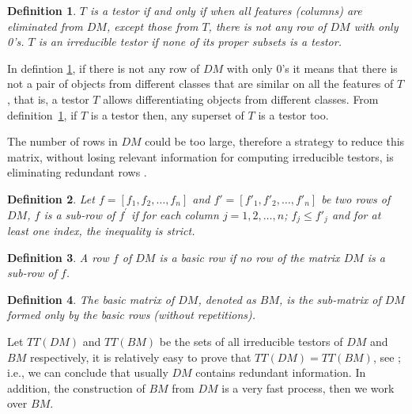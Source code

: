 \documentclass[conference]{IEEEtran}
\newtheorem{definition}{Definition}
\begin{document}
\begin{definition} \label{def1}
$T$ is a testor if and only if when all
features (columns) are eliminated from $DM$, except those from $T$, there is
not any row of $DM$ with only 0's. $T$ is an irreducible testor if none of its proper subsets is a testor.
\end{definition}

In defintion \ref{def1}, if there is not any row of $DM$ with only
0's it means that there is not a pair of objects from different
classes that are similar on all the features of $T$, that is, a
testor $T$ allows differentiating objects from different
classes. From definition~\ref{def1}, if $T$ is a testor then, any superset of $T$ is a testor too.

The number of rows in $DM$ could be too large, therefore a strategy to reduce this matrix, without losing
relevant information for computing irreducible testors, is eliminating redundant rows \cite{Lazo01}.

\begin{definition}
Let $f=[f_1, f_2, \dots , f_n]$ and $f'=[f'_1, {f'}_2, \dots , {f'}_n]$ be two rows of $DM$, $f$ 
is a sub-row of $f^{'}$ if for each column $j=1,2,\dots ,n$;  $f_{j} \le f'_{j}$ and for at least one index, the 
inequality is strict.
\end{definition}

\begin{definition}
A row $f$ of $DM$ is a basic row if no row of the matrix $DM$ is a sub-row of $f$. 
\end{definition}

\begin{definition}
The basic matrix of $DM$, denoted as $BM$, is the sub-matrix of $DM$ formed only by the basic rows (without 
repetitions).

\end{definition}

Let $TT(DM)$ and $TT(BM)$ be the sets of all irreducible testors of $DM$ and $BM$ respectively, it is 
relatively easy to prove that $TT(DM)=TT(BM)$, see \cite{Lazo95}; i.e., we can conclude that usually $DM$ 
contains redundant information. In addition, the construction of $BM$ from $DM$ is a very fast process, 
then we work over $BM$.

\end{document}

